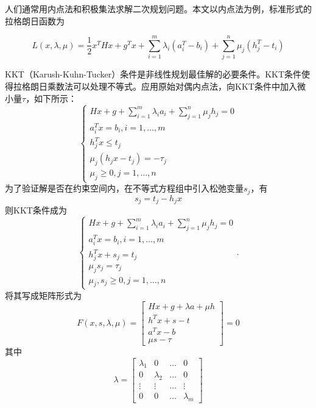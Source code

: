
人们通常用内点法和积极集法求解二次规划问题。本文以内点法为例，标准形式的拉格朗日函数为

\begin{equation}
	L(x,\lambda,\mu) = \frac{1}{2}x^THx+g^Tx+\sum_{i=1}^{m}\lambda_i(a_i^T-b_i) + \sum_{j=1}^{n}\mu_j(h_j^T-t_i)
\end{equation}


KKT（Karush-Kuhn-Tucker）条件是非线性规划最佳解的必要条件。KKT条件使得拉格朗日乘数法可以处理不等式。应用原始对偶内点法，向KKT条件中加入微小量${\tau}$，如下所示：
\begin{equation}
	\begin{cases}
		Hx+g+\sum_{i=1}^{m}\lambda_ia_i+\sum_{j=1}^{n}\mu_jh_j=0\\
		a_i^Tx=b_i, i=1,\ldots,m \\
		h_j^Tx \leq t_j \\
		\mu_j(h_jx-t_j)=-\tau_j \\
		\mu_j \geq 0, j = 1, \ldots ,n
	\end{cases}
\end{equation}
为了验证解是否在约束空间内，在不等式方程组中引入松弛变量${s_j}$，有
\begin{equation}
	s_j=t_j-h_jx
\end{equation}
则KKT条件成为
\begin{equation}
	\begin{cases}
		Hx+g+\sum_{i=1}^{m}\lambda_ia_i+\sum_{j=1}^{n}\mu_jh_j=0\\
		a_i^Tx=b_i, i=1,\ldots,m \\
		h_j^Tx +s_j = t_j \\
		\mu_js_j=\tau_j \\
		\mu_j,s_j \geq 0, j = 1, \ldots ,n
	\end{cases}.
\end{equation}
将其写成矩阵形式为
\begin{equation}
F(x,s,\lambda,\mu)=
\begin{bmatrix}
	Hx+g+\lambda a + \mu h \\
	h^Tx+s-t \\
	a^Tx - b \\
	\mu s - \tau 
\end{bmatrix}
=0
\end{equation}
其中
\begin{equation}
	\lambda=
	\begin{bmatrix}
		\lambda_1 & 0 & \ldots & 0 \\
		0 & \lambda_2 & \ldots & 0 \\
		\vdots & \vdots & \ldots & \vdots \\
		0 & 0 & \ldots & \lambda_m
	\end{bmatrix}
\end{equation}


